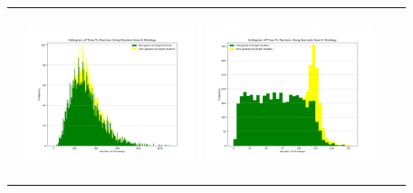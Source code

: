 \begin{landscape}
\begin{table}[h!]
\begin{tabular}{ | c | c | c | c | c |}
\begin{minipage}[c][49mm][c]{49mm}
    \end{minipage}
    &
    \begin{minipage}[c][49mm][c]{49mm}
      \includegraphics[width=49mm, height=49mm]{Chapters/MultiAgentTargetDetection/Figs/Histograms/MultipleAgent/2/SingleAgentSingleSource2RandomHistogram.png}
    \end{minipage}
    &
    \begin{minipage}[c][49mm][c]{49mm}
      \includegraphics[width=49mm, height=49mm]{Chapters/MultiAgentTargetDetection/Figs/Histograms/MultipleAgent/2/SingleAgentSingleSource2SaccadicHistogram.png}
    \end{minipage}
    \\


\end{tabular}
\end{table}
\end{landscape}

